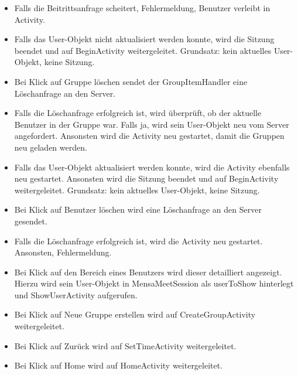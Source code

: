 \documentclass[a4paper]{scrreprt}
\begin{document}
\begin{itemize}
\item Falls die Beitrittsanfrage scheitert, Fehlermeldung, Benutzer verleibt in Activity.
\item Falls das User-Objekt nicht aktualisiert werden konnte, wird die Sitzung beendet und auf BeginActivity weitergeleitet. Grundsatz: kein aktuelles User-Objekt, keine Sitzung.
\item Bei Klick auf Gruppe löschen sendet der GroupItemHandler eine Löschanfrage an den Server.
\item Falls die Löschanfrage erfolgreich ist, wird überprüft, ob der aktuelle Benutzer in der Gruppe war. Falls ja, wird sein User-Objekt neu vom Server angefordert. Ansonsten wird die Activity neu gestartet, damit die Gruppen neu geladen werden.
\item Falls das User-Objekt aktualisiert werden konnte, wird die Activity ebenfalls neu gestartet. Ansonsten wird die Sitzung beendet und auf BeginActivity weitergeleitet. Grundsatz: kein aktuelles User-Objekt, keine Sitzung.
\item Bei Klick auf Benutzer löschen wird eine Löschanfrage an den Server gesendet. 
\item Falls die Löschanfrage erfolgreich ist, wird die Activity neu gestartet. Ansonsten, Fehlermeldung.
\item Bei Klick auf den Bereich eines Benutzers wird dieser detailliert angezeigt. Hierzu wird sein User-Objekt in MensaMeetSession als userToShow hinterlegt und ShowUserActivity aufgerufen.
\item Bei Klick auf Neue Gruppe erstellen wird auf CreateGroupActivity weitergeleitet.
\item Bei Klick auf Zurück wird auf SetTimeActivity weitergeleitet.
\item Bei Klick auf Home wird auf HomeActivity weitergeleitet.

\end{itemize}
\end{document}
